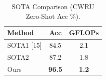 \begin{table}[htbp]
\centering
\caption{SOTA Comparison (CWRU Zero-Shot Acc \%).}
\label{tab:VI}
\begin{tabular}{@{}lcc@{}}
\toprule
Method & Acc & GFLOPs \\
\midrule
SOTA1 [15] & 84.5 & 2.1 \\
SOTA2 & 87.2 & 1.8 \\
Ours & \textbf{96.5} & \textbf{1.2} \\
\bottomrule
\end{tabular}
\end{table}
